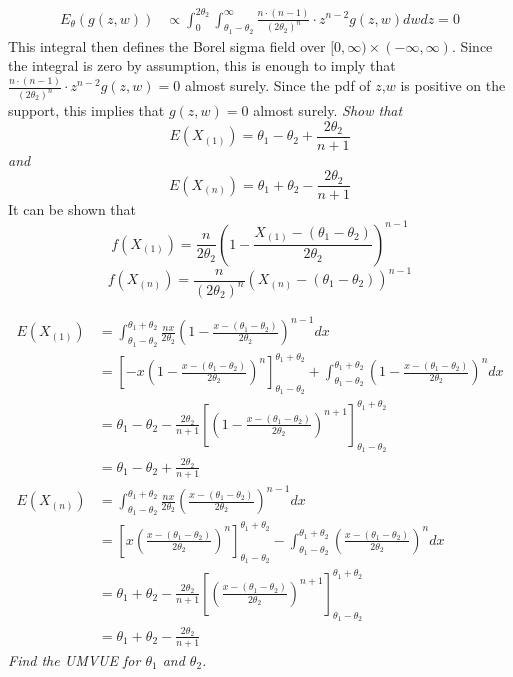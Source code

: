 \documentclass[11pt]{report}
\begin{document}
\begin{align*}
E_\theta(g(z,w)) &\propto \int_0^{2 \theta_2} \int_{\theta_1-\theta_2}^{\infty} \frac{n \cdot (n-1)}{\left( 2 \theta_2 \right)^n } \cdot z^{n-2} g(z, w) dw dz = 0
\end{align*}
This integral then defines the Borel sigma field over $[0, \infty) \times (-\infty, \infty)$. Since the integral is zero by assumption, this is enough to imply that $\frac{n \cdot (n-1)}{\left( 2 \theta_2 \right)^n } \cdot z^{n-2} g(z, w) = 0$ almost surely. Since the pdf of $z$,$w$ is positive on the support, this implies that $g(z, w) = 0$ almost surely.
\newline
\newline
\emph{Show that 
\[ E(X_{(1)}) = \theta_1 - \theta_2 + \frac{2 \theta_2}{n+1} \] and 
\[ E(X_{(n)}) = \theta_1 + \theta_2 - \frac{2 \theta_2}{n+1} \] }
It can be shown that
\[ f(X_{(1)}) = \frac{n}{ 2 \theta_2 } \left( 1 - \frac{X_{(1)} - (\theta_1-\theta_2)}{2 \theta_2} \right)^{n-1} \]
\[ f(X_{(n)}) = \frac{n}{\left( 2 \theta_2 \right)^n} \left( X_{(n)} - (\theta_1 - \theta_2) \right)^{n-1} \]

\begin{align*}
E(X_{(1)}) &= \int_{\theta_1 - \theta_2}^{\theta_1 + \theta_2} \frac{nx}{2 \theta_2} \left( 1-\frac{x-(\theta_1 - \theta_2)}{2 \theta_2} \right)^{n-1} dx \\
	&= \left[ -x\left( 1 - \frac{x - (\theta_1-\theta_2)}{2 \theta_2} \right)^n \right]_{\theta_1 -\theta_2}^{\theta_1 + \theta_2} + \int_{\theta_1 - \theta_2}^{\theta_1 + \theta_2} \left( 1-\frac{x-(\theta_1 - \theta_2)}{2 \theta_2} \right)^{n} dx \\
	&= \theta_1 - \theta_2 - \frac{2 \theta_2}{n+1} \left[ \left( 1 - \frac{x - (\theta_1-\theta_2)}{2 \theta_2} \right)^{n+1} \right]_{\theta_1 -\theta_2}^{\theta_1 + \theta_2} \\
	&= \theta_1 - \theta_2 + \frac{2 \theta_2}{n+1} \\
%
E(X_{(n)}) &= \int_{\theta_1 - \theta_2}^{\theta_1 + \theta_2} \frac{nx}{2 \theta_2} \left( \frac{x-(\theta_1 - \theta_2)}{2 \theta_2} \right)^{n-1} dx \\
	&= \left[ x\left( \frac{x - (\theta_1-\theta_2)}{2 \theta_2} \right)^n \right]_{\theta_1 -\theta_2}^{\theta_1 + \theta_2} - \int_{\theta_1 - \theta_2}^{\theta_1 + \theta_2} \left( \frac{x-(\theta_1 - \theta_2)}{2 \theta_2} \right)^{n} dx \\
	&= \theta_1 + \theta_2 - \frac{2 \theta_2}{n+1} \left[ \left( \frac{x - (\theta_1-\theta_2)}{2 \theta_2} \right)^{n+1} \right]_{\theta_1 -\theta_2}^{\theta_1 + \theta_2} \\
	&= \theta_1 + \theta_2 - \frac{2 \theta_2}{n+1}
\end{align*}
\newline
\newline
\emph{Find the UMVUE for $\theta_1$ and $\theta_2$.}
\end{document}
